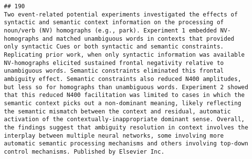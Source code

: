 \documentclass[
  english,
  man]{apa6}
\begin{document}
\begin{verbatim}
## 190                                                                                                                                                                                                                                                                                                                                                                                                                                                                                                                                                                                                                                                                                                                                                                                                                                                                                                                                                                                                                                                                                                                                                                                                                                                                                                                                                                                                                                Two event-related potential experiments investigated the effects of syntactic and semantic context information on the processing of noun/verb (NV) homographs (e.g., park). Experiment 1 embedded NV-homographs and matched unambiguous words in contexts that provided only syntactic Cues or both syntactic and semantic constraints. Replicating prior work, when only syntactic information was available NV-homographs elicited sustained frontal negativity relative to unambiguous words. Semantic constraints eliminated this frontal ambiguity effect. Semantic constraints also reduced N400 amplitudes, but less so for homographs than unambiguous words. Experiment 2 showed that this reduced N400 facilitation was limited to cases in which the semantic context picks out a non-dominant meaning, likely reflecting the semantic mismatch between the context and residual, automatic activation of the contextually-inappropriate dominant sense. Overall, the findings suggest that ambiguity resolution in context involves the interplay between multiple neural networks, some involving more automatic semantic processing mechanisms and others involving top-down control mechanisms. Published by Elsevier Inc.

\end{verbatim}
\end{document}
